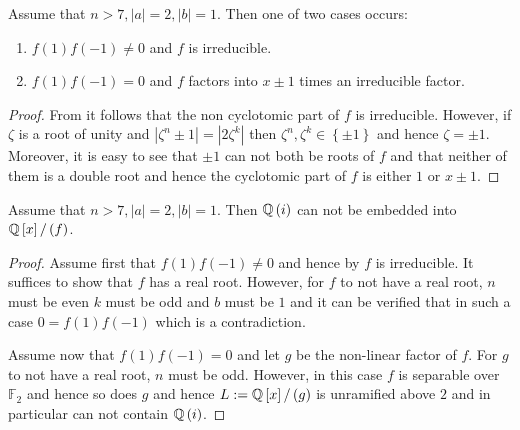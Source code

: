 \documentclass[../main.tex]{subfiles}
\begin{document}
\begin{lemma}
  \label{lem:factorization_of_f}
  Assume that $n > 7, \left| a \right| = 2, \left| b \right| = 1$.
  Then one of two cases occurs:
  \begin{enumerate}
    \item $f\left( 1 \right)f\left( -1 \right) \neq 0$ and $f$ is irreducible.
    \item $f\left( 1 \right)f\left( -1 \right) = 0$ and $f$ factors into $x \pm 1$ times an irreducible factor.
  \end{enumerate}
\end{lemma}
\begin{proof}
  From \cite[p. 248]{Filaseta2019ComputationallyCP} it follows that the non cyclotomic part of $f$ is irreducible.
  However, if $\zeta$ is a root of unity and 
  $
    \left| \zeta^n \pm 1 \right| = \left| 2\zeta^k \right|
  $
  then 
  $
    \zeta^n,\zeta^k \in \left\{ \pm 1 \right\}
  $
  and hence $\zeta = \pm 1$.
  Moreover, it is easy to see that $\pm 1$ can not both be roots of $f$ and that neither of them is a double root and hence the cyclotomic part of $f$ is either $1$ or $x \pm 1$.
\end{proof}
\begin{lemma}
  \label{lem:Qi_not_embeddable_if_a2_b1}
  Assume that $n > 7, \left| a \right| = 2, \left| b \right| = 1$.
  Then $\mathbb{Q}\left( i \right)$ can not be embedded into $\mathbb{Q}\left[ x \right]/ \left( f \right)$.
\end{lemma}
\begin{proof}
  Assume first that $f\left( 1 \right)f\left( -1 \right) \neq 0$ and hence by  $f$ is irreducible.
  It suffices to show that $f$ has a real root.
  However, for $f$ to not have a real root, $n$ must be even $k$ must be odd and $b$ must be $1$ and it can be verified that in such a case $0 = f\left( 1 \right)f\left( -1 \right)$ which is a contradiction.
  
  Assume now that $f\left( 1 \right)f\left( -1 \right) = 0$ and let $g$ be the non-linear factor of $f$.
  For $g$ to not have a real root, $n$ must be odd.
  However, in this case $f$ is separable over $\mathbb{F}_2$ and hence so does $g$ and hence $L:= \mathbb{Q}\left[ x \right] / \left( g \right)$ is unramified above $2$ and in particular can not contain $\mathbb{Q}\left( i \right)$.
\end{proof}
\end{document}
